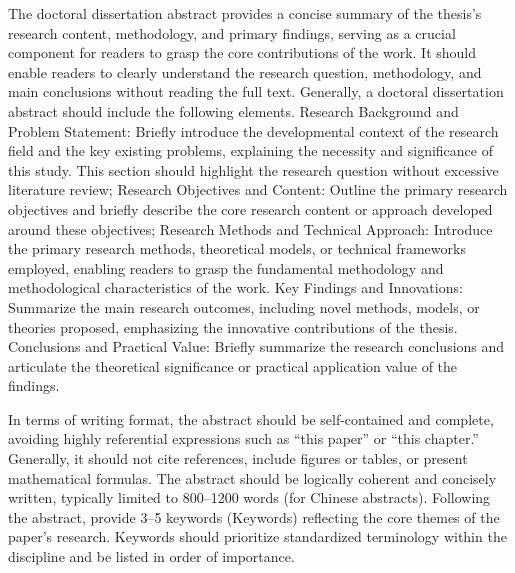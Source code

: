 \begin{enabstract}

The doctoral dissertation abstract provides a concise summary of the thesis's research content, methodology, and primary findings, serving as a crucial component for readers to grasp the core contributions of the work. It should enable readers to clearly understand the research question, methodology, and main conclusions without reading the full text. Generally, a doctoral dissertation abstract should include the following elements. Research Background and Problem Statement: Briefly introduce the developmental context of the research field and the key existing problems, explaining the necessity and significance of this study. This section should highlight the research question without excessive literature review; Research Objectives and Content: Outline the primary research objectives and briefly describe the core research content or approach developed around these objectives; Research Methods and Technical Approach: Introduce the primary research methods, theoretical models, or technical frameworks employed, enabling readers to grasp the fundamental methodology and methodological characteristics of the work. Key Findings and Innovations: Summarize the main research outcomes, including novel methods, models, or theories proposed, emphasizing the innovative contributions of the thesis. Conclusions and Practical Value: Briefly summarize the research conclusions and articulate the theoretical significance or practical application value of the findings.

In terms of writing format, the abstract should be self-contained and complete, avoiding highly referential expressions such as “this paper” or “this chapter.” Generally, it should not cite references, include figures or tables, or present mathematical formulas. The abstract should be logically coherent and concisely written, typically limited to 800–1200 words (for Chinese abstracts). Following the abstract, provide 3–5 keywords (Keywords) reflecting the core themes of the paper's research. Keywords should prioritize standardized terminology within the discipline and be listed in order of importance.

\par\vspace{\baselineskip}
\end{enabstract}

\cleardoublepage %
